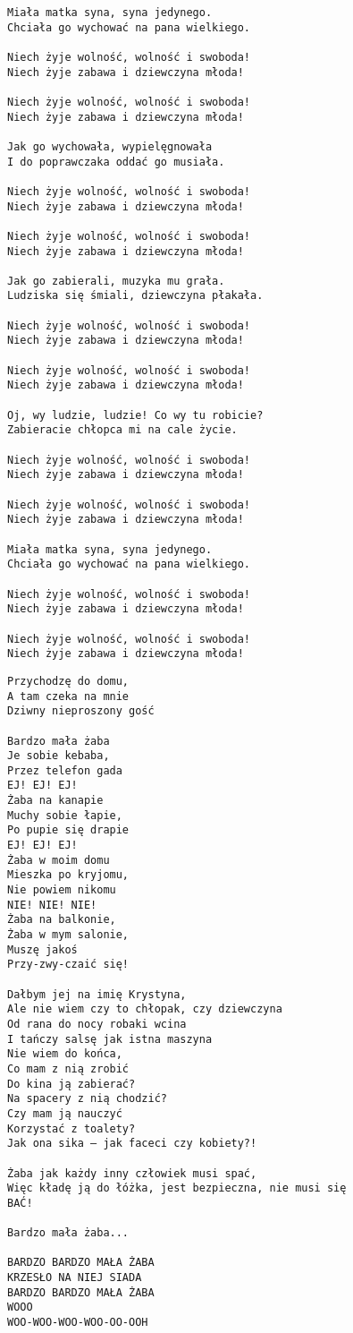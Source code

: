 \documentclass[12pt]{article}
\begin{document}
\begin{verbatim}
Miała matka syna, syna jedynego.
Chciała go wychować na pana wielkiego.

Niech żyje wolność, wolność i swoboda!
Niech żyje zabawa i dziewczyna młoda!

Niech żyje wolność, wolność i swoboda!
Niech żyje zabawa i dziewczyna młoda!

Jak go wychowała, wypielęgnowała
I do poprawczaka oddać go musiała.

Niech żyje wolność, wolność i swoboda!
Niech żyje zabawa i dziewczyna młoda!

Niech żyje wolność, wolność i swoboda!
Niech żyje zabawa i dziewczyna młoda!

Jak go zabierali, muzyka mu grała.
Ludziska się śmiali, dziewczyna płakała.

Niech żyje wolność, wolność i swoboda!
Niech żyje zabawa i dziewczyna młoda!

Niech żyje wolność, wolność i swoboda!
Niech żyje zabawa i dziewczyna młoda!

Oj, wy ludzie, ludzie! Co wy tu robicie?
Zabieracie chłopca mi na cale życie.

Niech żyje wolność, wolność i swoboda!
Niech żyje zabawa i dziewczyna młoda!

Niech żyje wolność, wolność i swoboda!
Niech żyje zabawa i dziewczyna młoda!

Miała matka syna, syna jedynego.
Chciała go wychować na pana wielkiego.

Niech żyje wolność, wolność i swoboda!
Niech żyje zabawa i dziewczyna młoda!

Niech żyje wolność, wolność i swoboda!
Niech żyje zabawa i dziewczyna młoda!
\end{verbatim}
\clearpage

\begin{verbatim}
Przychodzę do domu,
A tam czeka na mnie
Dziwny nieproszony gość

Bardzo mała żaba
Je sobie kebaba,
Przez telefon gada
EJ! EJ! EJ!
Żaba na kanapie
Muchy sobie łapie,
Po pupie się drapie
EJ! EJ! EJ!
Żaba w moim domu
Mieszka po kryjomu,
Nie powiem nikomu
NIE! NIE! NIE!
Żaba na balkonie,
Żaba w mym salonie,
Muszę jakoś
Przy-zwy-czaić się!

Dałbym jej na imię Krystyna,
Ale nie wiem czy to chłopak, czy dziewczyna
Od rana do nocy robaki wcina
I tańczy salsę jak istna maszyna
Nie wiem do końca,
Co mam z nią zrobić
Do kina ją zabierać?
Na spacery z nią chodzić?
Czy mam ją nauczyć
Korzystać z toalety?
Jak ona sika — jak faceci czy kobiety?!

Żaba jak każdy inny człowiek musi spać,
Więc kładę ją do łóżka, jest bezpieczna, nie musi się
BAĆ!

Bardzo mała żaba...

BARDZO BARDZO MAŁA ŻABA
KRZESŁO NA NIEJ SIADA
BARDZO BARDZO MAŁA ŻABA
WOOO
WOO-WOO-WOO-WOO-OO-OOH
\end{verbatim}
\clearpage
\end{document}
